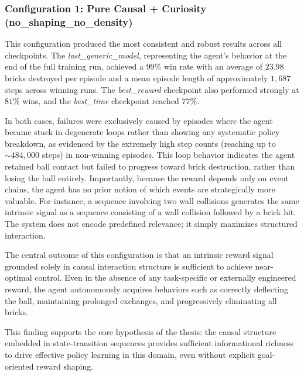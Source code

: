 \documentclass[12pt,a4paper]{report}
\begin{document}
\subsubsection{Configuration 1: Pure Causal + Curiosity (no\_shaping\_no\_density)}

This configuration produced the most consistent and robust results across all checkpoints.
 The \textit{last\_generic\_model}, representing the agent's behavior at the end of the full training run, achieved a $99$\% win rate with an average of $23{.}98$ bricks destroyed per episode and a mean episode length of approximately $1{,}687$ steps across winning runs. The \textit{best\_reward} checkpoint also performed strongly at $81$\% wins, and the \textit{best\_time} checkpoint reached $77$\%. 
 
In both cases, failures were exclusively caused by episodes where the agent became stuck in degenerate loops rather than showing any systematic policy breakdown, as evidenced by the extremely high step counts (reaching up to ${\sim}484{,}000$ steps) in non-winning episodes. This loop behavior indicates the agent retained ball contact but failed to progress toward brick destruction, rather than losing the ball entirely.
Importantly, because the reward depends only on event chains, the agent has no prior notion of which events are strategically more valuable. For instance, a sequence involving two wall collisions generates the same intrinsic signal as a sequence consisting of a wall collision followed by a brick hit. The system does not encode predefined relevance; it simply maximizes structured interaction.

The central outcome of this configuration is that an intrinsic reward signal grounded solely in causal interaction structure is sufficient to achieve near-optimal control. Even in the absence of any task-specific or externally engineered reward, the agent autonomously acquires behaviors such as correctly deflecting the ball, maintaining prolonged exchanges, and progressively eliminating all bricks.

This finding supports the core hypothesis of the thesis: the causal structure embedded in state-transition sequences provides sufficient informational richness to drive effective policy learning in this domain, even without explicit goal-oriented reward shaping.
\end{document}
